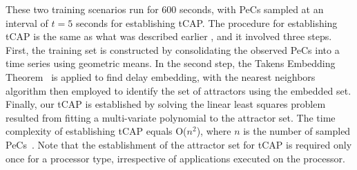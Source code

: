 These two training scenarios run for 600 seconds, with PeCs sampled at
an interval of $t=5$ seconds for establishing tCAP.  The procedure for
establishing tCAP is the same as what was described earlier
\cite{Lewis2010}, and it involved three steps. First, the training set
is constructed by consolidating the observed PeCs into a time series
using geometric means.  In the second step, the Takens Embedding
Theorem~\cite{Su2010} is applied to find delay embedding, with the
nearest neighbors algorithm then employed to identify the set of
attractors using the embedded set.  Finally, our tCAP is established by
solving the linear least squares problem resulted from fitting a
multi-variate polynomial to the attractor set.  The time complexity of
establishing tCAP equals O($n ^2$), where $n$ is the number of sampled
PeCs~\cite{Lewis2010}.  Note that the establishment of the attractor set
for tCAP is required only once for a processor type, irrespective of
applications executed on the processor.

